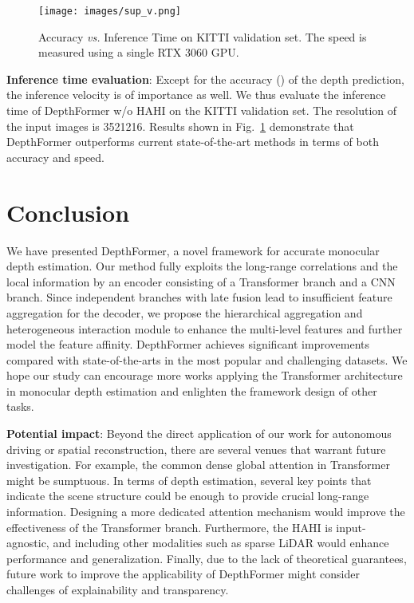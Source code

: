 \documentclass[twocolumn]{svjour3}    \pdfoutput=1
\begin{document}
\begin{figure}
    \centering
    \footnotesize
    \texttt{[image: images/sup\_v.png]}
    \caption{Accuracy  \textit{vs.} Inference Time on KITTI validation set. The speed is measured using a single RTX 3060 GPU.}
    \label{fig:sup-v}
\end{figure}
  
 
\textbf{Inference time evaluation}:
Except for the accuracy () of the depth prediction, the inference velocity is of importance as well. We thus evaluate the inference time of DepthFormer w/o HAHI on the KITTI validation set. The resolution of the input images is 3521216.  Results shown in Fig.~\ref{fig:sup-v} demonstrate that DepthFormer outperforms current state-of-the-art methods in terms of both accuracy and speed.



\section{Conclusion}
\label{sec:conclusion}
We have presented DepthFormer, a novel framework for accurate monocular depth estimation. Our method fully exploits the long-range correlations and the local information by an encoder consisting of a Transformer branch and a CNN branch. Since independent branches with late fusion lead to insufficient feature aggregation for the decoder, we propose the hierarchical aggregation and heterogeneous interaction module to enhance the multi-level features and further model the feature affinity. DepthFormer achieves significant improvements compared with state-of-the-arts in the most popular and challenging datasets. We hope our study can encourage more works applying the Transformer architecture in monocular depth estimation and enlighten the framework design of other tasks.

\textbf{Potential impact}: Beyond the direct application of our work for autonomous driving or spatial reconstruction, there are several venues that warrant future investigation. For example, the common dense global attention in Transformer might be sumptuous. In terms of depth estimation, several key points that indicate the scene structure could be enough to provide crucial long-range information. Designing a more dedicated attention mechanism would improve the effectiveness of the Transformer branch. Furthermore, the HAHI is input-agnostic, and including other modalities such as sparse LiDAR would enhance performance and generalization. Finally, due to the lack of theoretical guarantees, future work to improve the applicability of DepthFormer might consider challenges of explainability and transparency.



      {\footnotesize}
\end{document}
